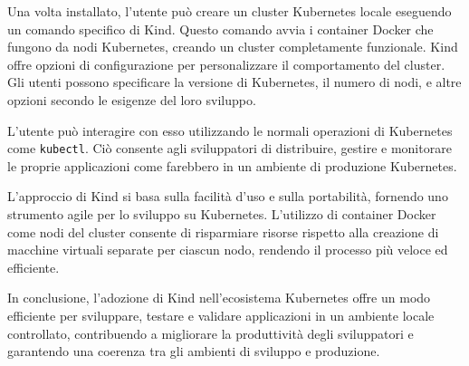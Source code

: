 Una volta installato, l'utente può creare un cluster Kubernetes locale eseguendo un comando specifico di Kind. Questo comando avvia i container Docker che fungono da nodi Kubernetes, creando un cluster completamente funzionale. Kind offre opzioni di configurazione per personalizzare il comportamento del cluster. Gli utenti possono specificare la versione di Kubernetes, il numero di nodi, e altre opzioni secondo le esigenze del loro sviluppo.

L'utente può interagire con esso utilizzando le normali operazioni di Kubernetes come {\small \verb|kubectl|}. Ciò consente agli sviluppatori di distribuire, gestire e monitorare le proprie applicazioni come farebbero in un ambiente di produzione Kubernetes.

L'approccio di Kind si basa sulla facilità d'uso e sulla portabilità, fornendo uno strumento agile per lo sviluppo su Kubernetes. L'utilizzo di container Docker come nodi del cluster consente di risparmiare risorse rispetto alla creazione di macchine virtuali separate per ciascun nodo, rendendo il processo più veloce ed efficiente.

In conclusione, l'adozione di Kind nell'ecosistema Kubernetes offre un modo efficiente per sviluppare, testare e validare applicazioni in un ambiente locale controllato, contribuendo a migliorare la produttività degli sviluppatori e garantendo una coerenza tra gli ambienti di sviluppo e produzione.

\clearpage